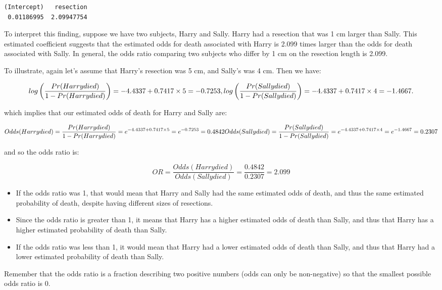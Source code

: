 \documentclass[]{book}
\providecommand{\tightlist}{%
  \setlength{\itemsep}{0pt}\setlength{\parskip}{0pt}}
\theoremstyle{definition}
\theoremstyle{definition}
\theoremstyle{definition}
\theoremstyle{remark}
\begin{document}
\begin{verbatim}
(Intercept)   resection 
 0.01186995  2.09947754 
\end{verbatim}

To interpret this finding, suppose we have two subjects, Harry and
Sally. Harry had a resection that was 1 cm larger than Sally. This
estimated coefficient suggests that the estimated odds for death
associated with Harry is 2.099 times larger than the odds for death
associated with Sally. In general, the odds ratio comparing two subjects
who differ by 1 cm on the resection length is 2.099.

To illustrate, again let's assume that Harry's resection was 5 cm, and
Sally's was 4 cm. Then we have:

\[
log\left(\frac{Pr(Harry died)}{1 - Pr(Harry died)}\right) = -4.4337 + 0.7417 \times 5 = -0.7253, \\
log\left(\frac{Pr(Sally died)}{1 - Pr(Sally died)}\right) = -4.4337 + 0.7417 \times 4 = -1.4667.
\]

which implies that our estimated odds of death for Harry and Sally are:

\[
Odds(Harry died) = \frac{Pr(Harry died)}{1 - Pr(Harry died)} = e^{-4.4337 + 0.7417 \times 5} = e^{-0.7253} = 0.4842 \\
Odds(Sally died) = \frac{Pr(Sally died)}{1 - Pr(Sally died)} = e^{-4.4337 + 0.7417 \times 4} = e^{-1.4667} = 0.2307
\]

and so the odds ratio is:

\[
OR = \frac{Odds(Harry died)}{Odds(Sally died)} = \frac{0.4842}{0.2307} = 2.099
\]

\begin{itemize}
\tightlist
\item
  If the odds ratio was 1, that would mean that Harry and Sally had the
  same estimated odds of death, and thus the same estimated probability
  of death, despite having different sizes of resections.
\item
  Since the odds ratio is greater than 1, it means that Harry has a
  higher estimated odds of death than Sally, and thus that Harry has a
  higher estimated probability of death than Sally.
\item
  If the odds ratio was less than 1, it would mean that Harry had a
  lower estimated odds of death than Sally, and thus that Harry had a
  lower estimated probability of death than Sally.
\end{itemize}

Remember that the odds ratio is a fraction describing two positive
numbers (odds can only be non-negative) so that the smallest possible
odds ratio is 0.
\end{document}
